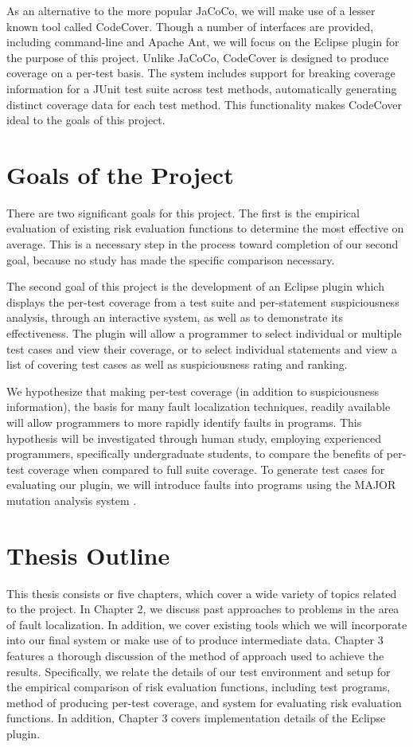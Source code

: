 As an alternative to the more popular JaCoCo, we will make use of a
lesser known tool called CodeCover.  Though a number of interfaces are
provided, including command-line and Apache Ant, we will focus on the
Eclipse plugin for the purpose of this project.  Unlike JaCoCo,
CodeCover is designed to produce coverage on a per-test basis.  The
system includes support for breaking coverage information for a JUnit 
test suite across test methods, automatically generating
distinct coverage data for each test method.  This functionality
makes CodeCover ideal to the goals of this project.

\section{Goals of the Project}\label{sec:goals}
There are two significant goals for this project.  The first is the
empirical evaluation of existing risk evaluation functions to 
determine the most effective on average.  This is a necessary step
in the process toward completion of our second goal, because no
study has made the specific comparison necessary.

The second goal of this project is the development of an Eclipse plugin
which displays the per-test coverage from a test suite and per-statement
suspiciousness analysis, through an interactive system, as well as to
demonstrate its effectiveness.  The plugin will allow a programmer to
select individual or multiple test cases and view their coverage, or
to select individual statements and view a list of covering test cases
as well as suspiciousness rating and ranking. 

We hypothesize that making per-test coverage (in addition to suspiciousness
information), the basis for many fault
localization techniques, readily available will allow programmers to
more rapidly identify faults in programs.  This hypothesis will be
investigated through human study, employing experienced programmers,
specifically undergraduate students, to compare
the benefits of per-test coverage when compared to full suite coverage.
To generate test cases for evaluating our plugin, we will introduce
faults into programs using the MAJOR mutation analysis system
\cite{major}.

\section{Thesis Outline}\label{sec:outline}
This thesis consists or five chapters, which cover a wide variety of
topics related to the project.  In Chapter 2, we discuss past approaches
to problems in the area of fault localization.  In addition, we cover
existing tools which we will incorporate into our final system or make
use of to produce intermediate data.  Chapter 3 features a thorough
discussion of the method of approach used to achieve the results.  Specifically,
we relate the details of our test environment and setup for the empirical
comparison of risk evaluation functions, including test programs, method of
producing per-test coverage, and system for evaluating risk evaluation functions.
In addition, Chapter 3 covers implementation details of the Eclipse plugin.

